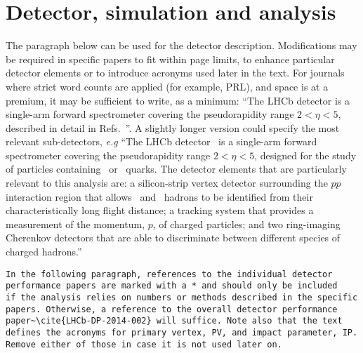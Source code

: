 \section{Detector, simulation and analysis}
\label{sec:Detector}
The paragraph below can be used for the detector
description. Modifications may be required in specific papers to fit
within page limits, to enhance particular detector elements or to
introduce acronyms used later in the text. For journals where strict
word counts are applied (for example, PRL), and space is at a premium,
it may be sufficient to write, as a minimum: ``The LHCb detector is a 
single-arm forward spectrometer covering the pseudorapidity range 
$2 < \eta < 5$, 
described in detail in Refs.~\cite{LHCb-DP-2008-001,LHCb-DP-2014-002}''. 
A slightly longer version could specify the most relevant sub-detectors, {\it e.g} 
``The LHCb 
detector~\cite{LHCb-DP-2008-001,LHCb-DP-2014-002} is a
single-arm forward spectrometer covering the pseudorapidity range $2 < \eta < 5$, designed for
the study of particles containing \bquark\ or \cquark\ quarks. The detector elements that are particularly
relevant to this analysis are: a silicon-strip vertex detector surrounding the $pp$ interaction
region that allows \cquark\ and \bquark\ hadrons to be identified from their characteristically long
flight distance; a tracking system that provides a measurement of the momentum, $p$, of charged
particles; and two ring-imaging Cherenkov detectors that are able to discriminate between
different species of charged hadrons.'' 

\begin{verbatim}
In the following paragraph, references to the individual detector 
performance papers are marked with a * and should only be included 
if the analysis relies on numbers or methods described in the specific 
papers. Otherwise, a reference to the overall detector performance 
paper~\cite{LHCb-DP-2014-002} will suffice. Note also that the text 
defines the acronyms for primary vertex, PV, and impact parameter, IP. 
Remove either of those in case it is not used later on.
\end{verbatim}

